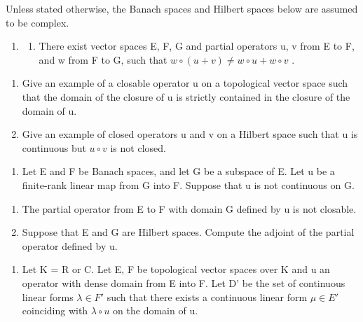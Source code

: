 \exercisesection{}

Unless stated otherwise, the Banach spaces and Hilbert spaces below are assumed to be complex.

\begin{enumerate}
\def\labelenumi{\arabic{enumi})}
\tightlist
\item
  \begin{enumerate}
  \def\labelenumii{\alph{enumii})}
  \tightlist
  \item
    There exist vector spaces E, F, G and partial operators u, v from E to F, and w from F to G, such that \(w \circ (u + v) \neq w \circ u + w \circ v\) .
  \end{enumerate}
\end{enumerate}

\begin{enumerate}
\def\labelenumi{\alph{enumi})}
\setcounter{enumi}{1}
\item
  Give an example of a closable operator u on a topological vector space such that the domain of the closure of u is strictly contained in the closure of the domain of u.
\item
  Give an example of closed operators u and v on a Hilbert space such that u is continuous but \(u \circ v\) is not closed.
\end{enumerate}

\begin{enumerate}
\def\labelenumi{\arabic{enumi})}
\setcounter{enumi}{1}
\tightlist
\item
  Let E and F be Banach spaces, and let G be a subspace of E. Let u be a finite-rank linear map from G into F. Suppose that u is not continuous on G.
\end{enumerate}

\begin{enumerate}
\def\labelenumi{\alph{enumi})}
\item
  The partial operator from E to F with domain G defined by u is not closable.
\item
  Suppose that E and G are Hilbert spaces. Compute the adjoint of the partial operator defined by u.
\end{enumerate}

\begin{enumerate}
\def\labelenumi{\arabic{enumi})}
\setcounter{enumi}{2}
\tightlist
\item
  Let K = R or C. Let E, F be topological vector spaces over K and u an operator with dense domain from E into F. Let D' be the set of continuous linear forms \(\lambda \in F'\) such that there exists a continuous linear form \(\mu \in E'\) coinciding with \(\lambda \circ u\) on the domain of u.
\end{enumerate}

